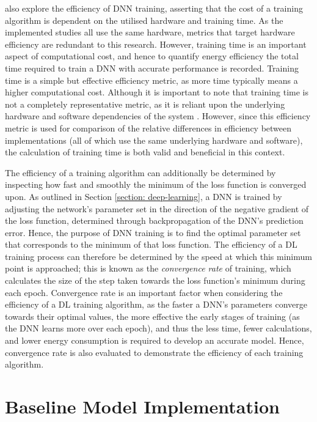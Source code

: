 \documentclass[a4paper, 11pt]{report}
\begin{document}
    \citet{amodei-2018} also explore the efficiency of DNN training, asserting that the cost of a training algorithm is dependent on the utilised hardware and training time. As the implemented studies all use the same hardware, metrics that target hardware efficiency are redundant to this research. However, training time is an important aspect of computational cost, and hence to quantify energy efficiency the total time required to train a DNN with accurate performance is recorded. Training time is a simple but effective efficiency metric, as more time typically means a higher computational cost. Although it is important to note that training time is not a completely representative metric, as it is reliant upon the underlying hardware and software dependencies of the system \citep{schwartz-2019}. However, since this efficiency metric is used for comparison of the relative differences in efficiency between implementations (all of which use the same underlying hardware and software), the calculation of training time is both valid and beneficial in this context.

    The efficiency of a training algorithm can additionally be determined by inspecting how fast and smoothly the minimum of the loss function is converged upon. As outlined in Section \ref{section: deep-learning}, a DNN is trained by adjusting the network's parameter set in the direction of the negative gradient of the loss function, determined through backpropagation of the DNN's prediction error. Hence, the purpose of DNN training is to find the optimal parameter set that corresponds to the minimum of that loss function. The efficiency of a DL training process can therefore be determined by the speed at which this minimum point is approached; this is known as the \emph{convergence rate} of training, which calculates the size of the step taken towards the loss function's minimum during each epoch. Convergence rate is an important factor when considering the efficiency of a DL training algorithm, as the faster a DNN's parameters converge towards their optimal values, the more effective the early stages of training (as the DNN learns more over each epoch), and thus the less time, fewer calculations, and lower energy consumption is required to develop an accurate model. Hence, convergence rate is also evaluated to demonstrate the efficiency of each training algorithm.


    \section{Baseline Model Implementation}
    \label{section: baseline}
\end{document}
